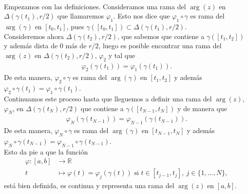 \\
\newline
Empezamos con las definiciones. Consideramos una rama del $\arg(z)$ en $\Delta(\gamma(t_1), r/2)$ que llamaremos $\varphi_1$. Esto nos dice que $\varphi_1 \circ \gamma$ es rama del $\arg(\gamma)$ en $[t_0, t_1]$, pues $\gamma([t_0,t_1]) \subset \Delta(\gamma(t_1), r/2)$.
\\
\newline
Consideremos ahora $\Delta(\gamma(t_2), r/2)$, que sabemos que contiene a $\gamma([t_1,t_2])$ y además dista de $0$ más de $r/2$, luego es posible encontrar una rama del $\arg(z)$ en $\Delta(\gamma(t_2), r/2)$, $\varphi_2$ y tal que
\begin{align*}
    \varphi_2 (\gamma(t_1)) = \varphi_1(\gamma(t_1)).
\end{align*}
De esta manera, $\varphi_2 \circ \gamma$ es rama del $\arg(\gamma)$ en $[t_1,t_2]$ y además $\varphi_2 \circ \gamma (t_1) = \varphi_1 \circ \gamma (t_1)$.
\\
\newline
Continuamos este proceso hasta que lleguemos a definir una rama del $\arg(z)$, $\varphi_N$, en $\Delta(\gamma(t_N), r/2)$ que contiene a $\gamma([t_{N-1},t_N])$ y de manera que
\begin{align*}
    \varphi_N (\gamma(t_{N-1})) = \varphi_{N-1}(\gamma(t_{N-1})).
\end{align*}
De esta manera, $\varphi_N \circ \gamma$ es rama del $\arg(\gamma)$ en $[t_{N-1},t_N]$ y además $\varphi_N \circ \gamma (t_{N-1}) = \varphi_{N-1} \circ \gamma (t_{N-1})$.
\\
\newline
Esto da pie a que la función
\begin{align*}
    \varphi : [a,b] &\longrightarrow \mathbb{R} \\
    t &\longmapsto \varphi(t) = \varphi_j(\gamma(t)) \text{ si } t \in [t_{j-1},t_j], \ j \in \{1,...,N\},
\end{align*}
está bien definida, es continua y representa una rama del $\arg(z)$ en $[a,b]$.

